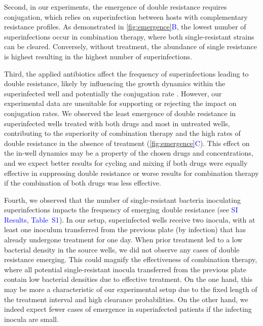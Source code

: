 \documentclass[9pt,twocolumn,twoside,lineno]{pnas-new}
\newcommand{\sitab}[1]{\textcolor{blue}{Table~S#1}}
\newcommand{\sisec}[1]{\textcolor{blue}{#1}}
\newcommand{\panelref}[2]{\autoref{#1}\textcolor{blue}{#2}}
\begin{document}
    Second, in our experiments, the emergence of double resistance requires conjugation, which relies on superinfection between hosts with complementary resistance profiles.
    As demonstrated in \panelref{fig:emergence}{B}, the lowest number of superinfections occur in combination therapy, where both single-resistant strains can be cleared. 
    Conversely, without treatment, the abundance of single resistance is highest resulting in the highest number of superinfections.
    
    Third, the applied antibiotics affect the frequency of superinfections leading to double resistance, likely by influencing the growth dynamics within the superinfected well and potentially the conjugation rate \cite{Headd2018}. 
    However, our experimental data are unsuitable for supporting or rejecting the impact on conjugation rates.
    We observed the least emergence of double resistance in superinfected wells treated with both drugs and most in untreated wells, contributing to the superiority of combination therapy and the high rates of double resistance in the absence of treatment (\panelref{fig:emergence}{C}).
    This effect on the in-well dynamics may be a property of the chosen drugs and concentrations, and we expect better results for cycling and mixing if both drugs were equally effective in suppressing double resistance or worse results for combination therapy if the combination of both drugs was less effective.
    
    Fourth, we observed that the number of single-resistant bacteria inoculating superinfections impacts the frequency of emerging double resistance (see \sisec{SI Results}, \sitab{1}). 
    In our setup, superinfected wells receive two inocula, with at least one inoculum transferred from the previous plate (by infection) that has already undergone treatment for one day. 
    When prior treatment led to a low bacterial density in the source wells, we did not observe any cases of double resistance emerging.
    This could magnify the effectiveness of combination therapy, where all potential single-resistant inocula transferred from the previous plate contain low bacterial densities due to effective treatment. 
    On the one hand, this may be more a characteristic of our experimental setup due to the fixed length of the treatment interval and high clearance probabilities. 
    On the other hand, we indeed expect fewer cases of emergence in superinfected patients if the infecting inocula are small.
    
\end{document}
